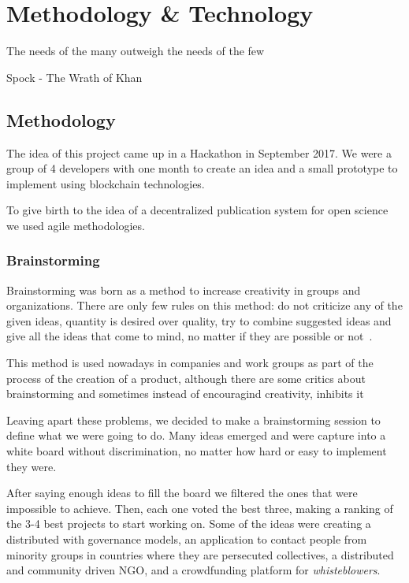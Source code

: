 \chapter{Methodology \& Technology}

\begin{FraseCelebre}
  \begin{Frase}
    The needs of the many outweigh the needs of the few
  \end{Frase}
  \begin{Fuente}
    Spock - The Wrath of Khan
  \end{Fuente}
\end{FraseCelebre}

\section{Methodology}
The idea of this project came up in a Hackathon in September 2017. We were a
group of 4 developers with one month to create an idea and a small prototype to
implement using blockchain technologies.

To give birth to the idea of a decentralized publication system for open science
we used agile methodologies.


\subsection{Brainstorming}

Brainstorming was born as a method to increase creativity in groups and
organizations. There are only few rules on this method: do not criticize any of
the given ideas, quantity is desired over quality, try to combine suggested
ideas and give all the ideas that come to mind, no matter if they are possible
or not~\cite{osborn1953applied}.

This method is used nowadays in companies and work groups as part of the process
of the creation of a product, although there are some critics about
brainstorming and sometimes instead of encouragind creativity, inhibits
it~\cite{sutton1996brainstorming,mullen1991productivity}

Leaving apart these problems, we decided to make a brainstorming session to
define what we were going to do. Many ideas emerged and were capture into a
white board without discrimination, no matter how hard or easy to implement they
were.

After saying enough ideas to fill the board we filtered the ones that were
impossible to achieve. Then, each one voted the best three, making a ranking of
the 3-4 best projects to start working on. Some of the ideas were creating a
distributed  with governance models, an application to contact
people from minority groups in countries where they are persecuted collectives,
a distributed and community driven NGO, and a crowdfunding platform for
\emph{whisteblowers}.

